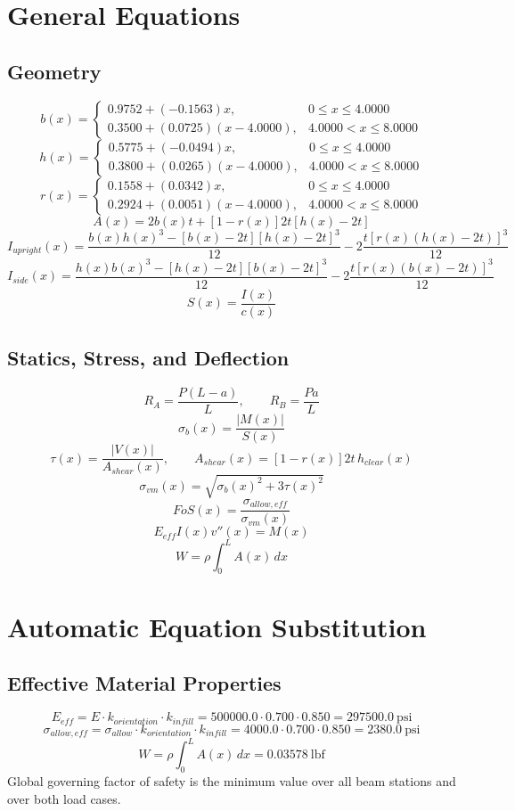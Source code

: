\documentclass[11pt]{article}
\begin{document}
\section*{General Equations}
\subsection*{Geometry}
\[
b(x)=\begin{cases}0.9752 + (-0.1563)x, & 0 \le x \le 4.0000\\0.3500 + (0.0725)(x-4.0000), & 4.0000 < x \le 8.0000\end{cases}
\]
\[
h(x)=\begin{cases}0.5775 + (-0.0494)x, & 0 \le x \le 4.0000\\0.3800 + (0.0265)(x-4.0000), & 4.0000 < x \le 8.0000\end{cases}
\]
\[
r(x)=\begin{cases}0.1558 + (0.0342)x, & 0 \le x \le 4.0000\\0.2924 + (0.0051)(x-4.0000), & 4.0000 < x \le 8.0000\end{cases}
\]
\[
A(x)=2b(x)t+[1-r(x)]2t[h(x)-2t]
\]
\[
I_{upright}(x)=\frac{b(x)h(x)^3-[b(x)-2t][h(x)-2t]^3}{12}-2\frac{t[r(x)(h(x)-2t)]^3}{12}
\]
\[
I_{side}(x)=\frac{h(x)b(x)^3-[h(x)-2t][b(x)-2t]^3}{12}-2\frac{t[r(x)(b(x)-2t)]^3}{12}
\]
\[
S(x)=\frac{I(x)}{c(x)}
\]

\subsection*{Statics, Stress, and Deflection}
\[
R_A=\frac{P(L-a)}{L}, \qquad R_B=\frac{Pa}{L}
\]
\[
\sigma_b(x)=\frac{|M(x)|}{S(x)}
\]
\[
\tau(x)=\frac{|V(x)|}{A_{shear}(x)}, \qquad A_{shear}(x)=[1-r(x)]2t\,h_{clear}(x)
\]
\[
\sigma_{vm}(x)=\sqrt{\sigma_b(x)^2+3\tau(x)^2}
\]
\[
FoS(x)=\frac{\sigma_{allow,eff}}{\sigma_{vm}(x)}
\]
\[
E_{eff}I(x)v''(x)=M(x)
\]
\[
W=\rho\int_0^L A(x)\,dx
\]

\section*{Automatic Equation Substitution}
\subsection*{Effective Material Properties}
\[E_{eff} = E \cdot k_{orientation} \cdot k_{infill} = 500000.0 \cdot 0.700 \cdot 0.850 = 297500.0\ \mathrm{psi}\]
\[\sigma_{allow,eff} = \sigma_{allow} \cdot k_{orientation} \cdot k_{infill} = 4000.0 \cdot 0.700 \cdot 0.850 = 2380.0\ \mathrm{psi}\]
\[W = \rho \int_0^L A(x)\,dx = 0.03578\ \mathrm{lbf}\]
Global governing factor of safety is the minimum value over all beam stations and over both load cases.
\end{document}
